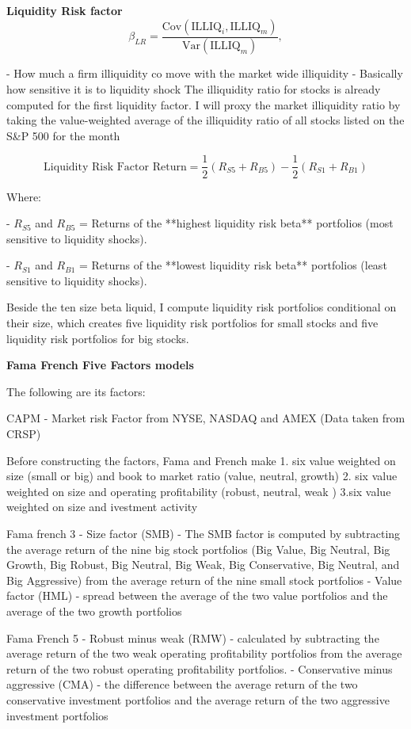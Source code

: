 \textbf{Liquidity Risk factor}
$$
\beta_{LR} = \frac{\text{Cov}(\text{ILLIQ}_i, \text{ILLIQ}_m)}{\text{Var}(\text{ILLIQ}_m)},
$$

- How much a firm illiquidity co move with the market wide illiquidity
- Basically how sensitive it is to liquidity shock 
The illiquidity ratio for stocks is already computed for the first liquidity factor. I will proxy the market illiquidity ratio by taking the value-weighted average of the illiquidity ratio of all stocks
listed on the S\&P 500 for the month


$$
\text{Liquidity Risk Factor Return} = \frac{1}{2} \left( R_{S5} + R_{B5} \right) - \frac{1}{2} \left( R_{S1} + R_{B1} \right)
$$

Where:

- \( R_{S5} \) and \( R_{B5} \) = Returns of the **highest liquidity risk beta** portfolios (most sensitive to liquidity shocks).

- \( R_{S1} \) and \( R_{B1} \) = Returns of the **lowest liquidity risk beta** portfolios (least sensitive to liquidity shocks).

Beside the ten size beta liquid, I compute liquidity risk portfolios conditional on their size,
which creates five liquidity risk portfolios for small stocks and five liquidity risk portfolios for
big stocks.

\textbf{Fama French Five Factors models}

The following are its factors:

CAPM
- Market risk Factor from NYSE, NASDAQ and AMEX (Data taken from CRSP)

Before constructing the factors, Fama and French make 
1. six value weighted on size (small or big) and book to market ratio (value, neutral, growth)
2. six value weighted on size and operating profitability (robust, neutral, weak )
3.six value weighted on size and ivestment activity

Fama french 3
- Size factor (SMB)
    - The SMB factor is computed by subtracting the average return of the nine big stock portfolios
    (Big Value, Big Neutral, Big Growth, Big Robust, Big Neutral, Big Weak, Big Conservative,
    Big Neutral, and Big Aggressive) from the average return of the nine small stock portfolios
- Value factor (HML)
    -  spread between the average of the two value portfolios and the average of the two growth portfolios

Fama French 5
- Robust minus weak (RMW)
    - calculated by subtracting the average return of the two
    weak operating profitability portfolios from the average return of the two robust operating
    profitability portfolios.
- Conservative minus aggressive (CMA)
    - the difference between the average return of
    the two conservative investment portfolios and the average return of the two aggressive
    investment portfolios 

